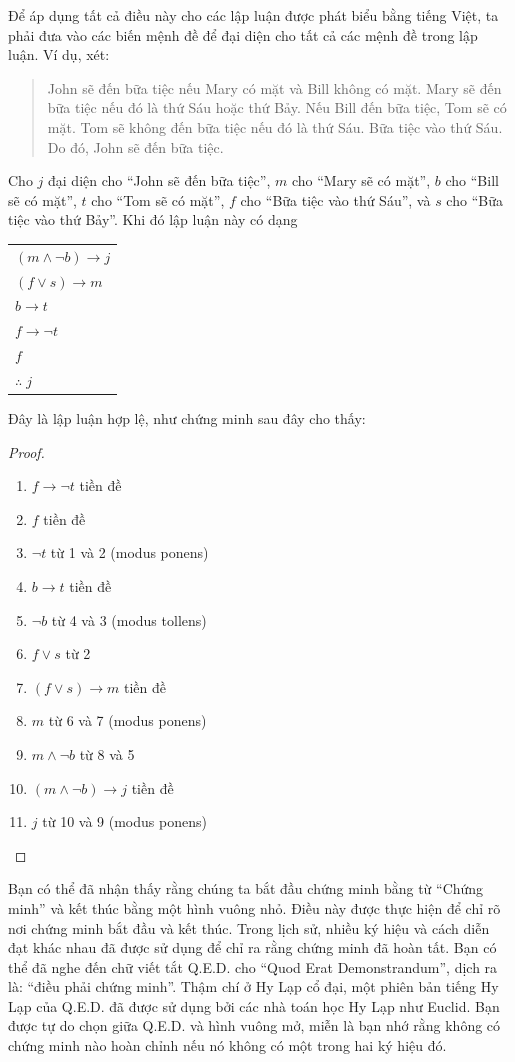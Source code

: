 Để áp dụng tất cả điều này cho các lập luận được phát biểu bằng tiếng Việt, ta phải đưa vào các biến mệnh đề để đại diện cho tất cả các mệnh đề trong lập luận. Ví dụ, xét:
\begin{quote}
John sẽ đến bữa tiệc nếu Mary có mặt và Bill không có mặt. Mary sẽ đến bữa tiệc nếu đó là thứ Sáu hoặc thứ Bảy. Nếu Bill đến bữa tiệc, Tom sẽ có mặt. Tom sẽ không đến bữa tiệc nếu đó là thứ Sáu. Bữa tiệc vào thứ Sáu. Do đó, John sẽ đến bữa tiệc.
\end{quote}
Cho $j$ đại diện cho ``John sẽ đến bữa tiệc'', $m$ cho ``Mary sẽ có mặt'', $b$ cho ``Bill sẽ có mặt'', $t$ cho ``Tom sẽ có mặt'', $f$ cho ``Bữa tiệc vào thứ Sáu'', và $s$ cho ``Bữa tiệc vào thứ Bảy''. Khi đó lập luận này có dạng
\begin{center}
\begin{tabular}{l}
$(m \land \neg b) \to j$ \\
$(f \lor s) \to m$ \\
$b \to t$ \\
$f \to \neg t$ \\
$f$ \\
\hline
$\therefore\; j$
\end{tabular}
\end{center}
Đây là lập luận hợp lệ, như chứng minh sau đây cho thấy:
\begin{proof}
\begin{enumerate}
\item $f \to \neg t$ \hfill tiền đề
\item $f$ \hfill tiền đề
\item $\neg t$ \hfill từ 1 và 2 (modus ponens)
\item $b \to t$ \hfill tiền đề
\item $\neg b$ \hfill từ 4 và 3 (modus tollens)
\item $f \lor s$ \hfill từ 2
\item $(f \lor s) \to m$ \hfill tiền đề
\item $m$ \hfill từ 6 và 7 (modus ponens)
\item $m \land \neg b$ \hfill từ 8 và 5
\item $(m \land \neg b) \to j$ \hfill tiền đề
\item $j$ \hfill từ 10 và 9 (modus ponens)
\end{enumerate}
\end{proof}

\begin{infobox}
Bạn có thể đã nhận thấy rằng chúng ta bắt đầu chứng minh bằng từ ``Chứng minh'' và kết thúc bằng một hình vuông nhỏ. Điều này được thực hiện để chỉ rõ nơi chứng minh bắt đầu và kết thúc. Trong lịch sử, nhiều ký hiệu và cách diễn đạt khác nhau đã được sử dụng để chỉ ra rằng chứng minh đã hoàn tất. Bạn có thể đã nghe đến chữ viết tắt Q.E.D. cho ``Quod Erat Demonstrandum'', dịch ra là: ``điều phải chứng minh''. Thậm chí ở Hy Lạp cổ đại, một phiên bản tiếng Hy Lạp của Q.E.D. đã được sử dụng bởi các nhà toán học Hy Lạp như Euclid. Bạn được tự do chọn giữa Q.E.D. và hình vuông mở, miễn là bạn nhớ rằng không có chứng minh nào hoàn chỉnh nếu nó không có một trong hai ký hiệu đó.
\end{infobox}

